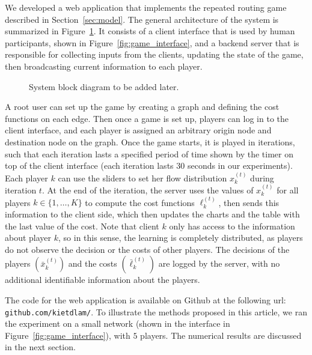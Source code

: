 \documentclass{sig-alternate-ipsn13}
\begin{document}
We developed a web application that implements the repeated routing game described in Section~\ref{sec:model}. The general architecture of the system is summarized in Figure~\ref{fig:system_block_diagram}. It consists of a client interface that is used by human participants, shown in Figure~\ref{fig:game_interface}, and a backend server that is responsible for collecting inputs from the clients, updating the state of the game, then broadcasting current information to each player. 

\begin{figure}[h]
  \centering
  \caption{\footnotesize System block diagram to be added later.}
  \label{fig:system_block_diagram}
\end{figure}


A root user can set up the game by creating a graph and defining the cost functions on each edge. Then once a game is set up, players can log in to the client interface, and each player is assigned an arbitrary origin node and destination node on the graph. Once the game starts, it is played in iterations, such that each iteration lasts a specified period of time shown by the timer on top of the client interface (each iteration lasts $30$ seconds in our experiments). Each player $k$ can use the sliders to set her flow distribution $x^{(t)}_k$ during iteration $t$. At the end of the iteration, the server uses the values of $x_k^{(t)}$ for all players $k \in \{1, \dots, K\}$ to compute the cost functions $\ell^{(t)}_k$, then sends this information to the client side, which then updates the charts and the table with the last value of the cost. Note that client $k$ only has access to the information about player $k$, so in this sense, the learning is completely distributed, as players do not observe the decision or the costs of other players. The decisions of the players $(\bar x_k^{(t)})$ and the costs $(\bar \ell^{(t)}_k)$ are logged by the server, with no additional identifiable information about the players.

The code for the web application is available on Github at the following url: \texttt{github.com/kietdlam/}. To illustrate the methods proposed in this article, we ran the experiment on a small network (shown in the interface in Figure~\ref{fig:game_interface}), with $5$ players. The numerical results are discussed in the next section.



\end{document}
